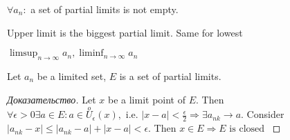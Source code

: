 \begin{corollary}[]
	$\forall a_n : $ a set of partial limits is not empty.
\end{corollary}

\begin{definition}[]
	Upper limit is the biggest partial limit. Same for lowest
\end{definition}

$\limsup_{n \to \infty} a_{n}, \liminf_{n \to \infty} a_n$



\begin{theorem}
	Let $a_n$ be a limited set, $E$ is a set of partial limits. 
\end{theorem}

\begin{proof}[Доказательство]
	Let $x$ be a limit point of $E$. Then $ \forall \epsilon > 0 \exists a \in E: a \in \overset{o}U_\epsilon  (x), \text{ i.e. } \left| x - a \right| < \frac{\epsilon}{2} \Rightarrow \exists a_{nk} \to a$. Consider $\left| a_{nk} - x \right|  \leq \left| a_{nk} - a \right| + \left| x - a \right| < \epsilon $. Then $x \in E \Rightarrow E \text{ is closed } $ 
\end{proof}
